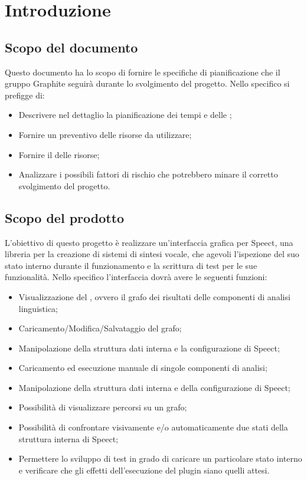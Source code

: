\documentclass[./PianodiProgetto.tex]{subfiles}
\begin{document}
	
	\chapter{Introduzione}
	\section{Scopo del documento}
	Questo documento ha lo scopo di fornire le specifiche di pianificazione che il gruppo Graphite seguirà durante lo svolgimento del progetto. Nello specifico si prefigge di:
	
	\begin{itemize}
		\item Descrivere nel dettaglio la pianificazione dei tempi e delle ;
		\item Fornire un preventivo delle risorse da utilizzare;
		\item Fornire il  delle risorse;
		\item Analizzare i possibili fattori di rischio che potrebbero minare il corretto svolgimento del progetto.
	\end{itemize}
	
	\section{Scopo del prodotto}
	
	L'obiettivo di questo progetto è realizzare un'interfaccia grafica per Speect, una libreria per la creazione di sistemi di sintesi vocale, che agevoli l'ispezione del suo stato interno durante il funzionamento e la scrittura di test per le sue funzionalità.
	Nello specifico l'interfaccia dovrà avere le seguenti funzioni:
	\begin{itemize}
		\item Visualizzazione del , ovvero il grafo dei risultati delle componenti di analisi linguistica;
		\item Caricamento/Modifica/Salvataggio del grafo;
		\item Manipolazione della struttura dati interna e la configurazione di Speect;
		\item Caricamento ed esecuzione manuale di singole componenti di analisi;
		\item Manipolazione della struttura dati interna e della configurazione di Speect;
		\item Possibilità di visualizzare percorsi su un grafo;
		\item Possibilità di confrontare visivamente e/o automaticamente due stati della struttura interna di Speect;
		\item Permettere lo sviluppo di test in grado di caricare un particolare stato interno e verificare che gli effetti dell’esecuzione del plugin siano quelli attesi.
	\end{itemize}
	
\end{document}

